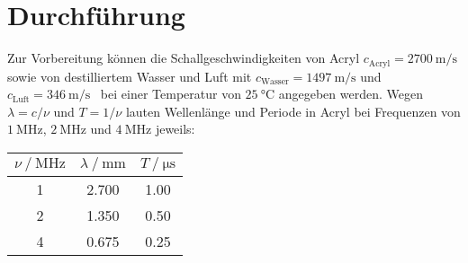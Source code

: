 \section{Durchführung}
\label{sec:durchführung}

Zur Vorbereitung können die Schallgeschwindigkeiten von Acryl $c_\text{Acryl} = \qty{2700}{\meter\per\second}$ \cite{doppler}
sowie von destilliertem Wasser und Luft mit $c_\text{Wasser} = \qty{1497}{\meter\per\second}$ und
$c_\text{Luft} = \qty{346}{\meter\per\second}$~\cite{lid_chem_phy} bei einer Temperatur von $\qty{25}{\celsius}$ angegeben werden.
Wegen $\lambda = c / \nu$ und $T = 1 / \nu$ lauten Wellenlänge und Periode in Acryl bei Frequenzen von $\qty{1}{\mega\hertz}$,
$\qty{2}{\mega\hertz}$ und $\qty{4}{\mega\hertz}$ jeweils:

\begin{table}[H]
	\centering
	\begin{tabular}{S[table-format=1.0] S[table-format=1.3] S[table-format=1.2]}
		\toprule
		{$\nu \mathbin{/} \unit{\mega\hertz}$} &
		{$\lambda \mathbin{/} \unit{\milli\meter}$} &
		{$T \mathbin{/} \unit{\micro\second}$} \\
		 & 2.700 & 1.00 \\
		2 & 1.350 & 0.50 \\
		4 & 0.675 & 0.25 \\
		\bottomrule
	\end{tabular}
\end{table}
